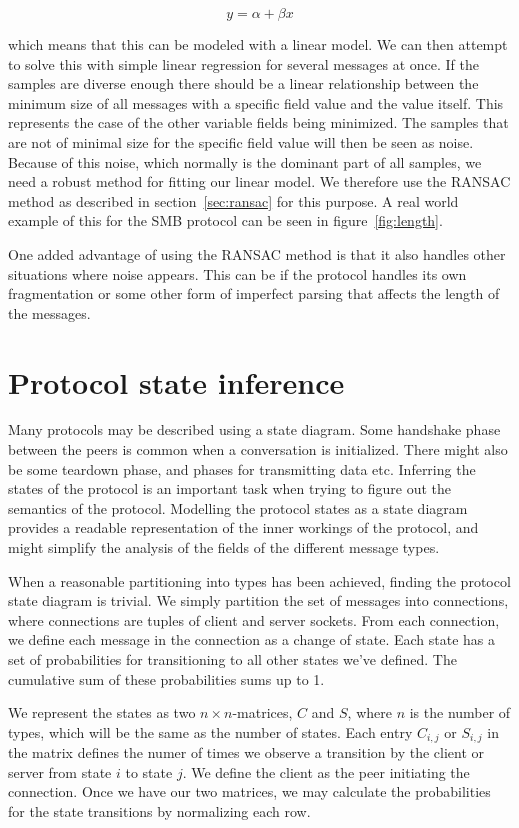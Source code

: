 \documentclass[a4paper]{report}
\begin{document}
\[
    y = \alpha + \beta x
    \label{eq:linlength}
\]

which means that this can be modeled with a linear model. We can then attempt
to solve this with simple linear regression for several messages at once. If
the samples are diverse enough there should be a linear relationship between
the minimum size of all messages with a specific field value and the value
itself. This represents the case of the other variable fields being minimized.
The samples that are not of minimal size for the specific field value will then
be seen as noise. Because of this noise, which normally is the dominant part of
all samples, we need a robust method for fitting our linear model. We therefore
use the RANSAC method as described in section~\ref{sec:ransac} for this
purpose. A real world example of this for the SMB protocol can be seen in
figure~\ref{fig:length}.

One added advantage of using the RANSAC method is that it also handles other
situations where noise appears. This can be if the protocol handles its own
fragmentation or some other form of imperfect parsing that affects the length
of the messages.

\section{Protocol state inference}
Many protocols may be described using a state diagram. Some handshake phase
between the peers is common when a conversation is initialized. There might
also be some teardown phase, and phases for transmitting data etc.
Inferring the states of the protocol is an important task when trying to
figure out the semantics of the protocol. Modelling the protocol states as
a state diagram provides a readable representation of the inner workings
of the protocol, and might simplify the analysis of the fields of the
different message types.

When a reasonable partitioning into types has been achieved, finding the
protocol state diagram is trivial. We simply partition the set of messages
into connections, where connections are tuples of client and server sockets.
From each connection, we define each message in the connection as a change
of state. Each state has a set of probabilities for transitioning to
all other states we've defined. The cumulative sum of these probabilities 
sums up to 1. 

We represent the states as two $n \times n$-matrices, $C$ and  $S$, where 
$n$ is the number of types, which will be the same as the number of states.
Each entry $C_{i,j}$ or $S_{i,j}$ in the matrix defines the numer of times
we observe a transition by the client or server from state $i$ to state $j$.
We define the client as the peer initiating the connection. Once we have our
two matrices, we may calculate the probabilities for the state transitions by
normalizing each row.
\end{document}
